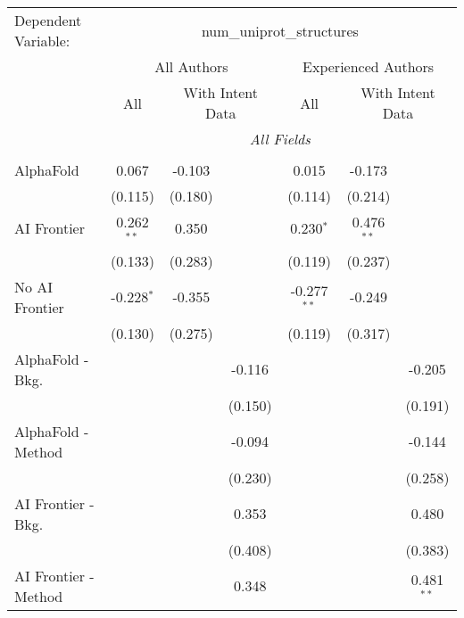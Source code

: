\begingroup
\centering
\begin{tabular}{lcccccc}
   \tabularnewline \midrule \midrule
   Dependent Variable: & \multicolumn{6}{c}{num\_uniprot\_structures}\\
 & \multicolumn{3}{c}{All Authors} & \multicolumn{3}{c}{Experienced Authors} \\
\cmidrule(lr){2-4} \cmidrule(lr){5-7}
 & \multicolumn{1}{c}{All} & \multicolumn{2}{c}{With Intent Data} & \multicolumn{1}{c}{All} & \multicolumn{2}{c}{With Intent Data} \\
\cmidrule(lr){2-2} \cmidrule(lr){3-4} \cmidrule(lr){5-5} \cmidrule(lr){6-7}
 & \multicolumn{6}{c}{\textit{All Fields}} \\ \\
   AlphaFold               & 0.067        & -0.103  &              & 0.015         & -0.173       &   \\   
                           & (0.115)      & (0.180) &              & (0.114)       & (0.214)      &   \\   
   AI Frontier             & 0.262$^{**}$ & 0.350   &              & 0.230$^{*}$   & 0.476$^{**}$ &   \\   
                           & (0.133)      & (0.283) &              & (0.119)       & (0.237)      &   \\   
   No AI Frontier          & -0.228$^{*}$ & -0.355  &              & -0.277$^{**}$ & -0.249       &   \\   
                           & (0.130)      & (0.275) &              & (0.119)       & (0.317)      &   \\   
   AlphaFold - Bkg.        &              &         & -0.116       &               &              & -0.205\\   
                           &              &         & (0.150)      &               &              & (0.191)\\   
   AlphaFold - Method      &              &         & -0.094       &               &              & -0.144\\   
                           &              &         & (0.230)      &               &              & (0.258)\\   
   AI Frontier - Bkg.      &              &         & 0.353        &               &              & 0.480\\   
                           &              &         & (0.408)      &               &              & (0.383)\\   
   AI Frontier - Method    &              &         & 0.348        &               &              & 0.481$^{**}$\\   

\end{tabular}
